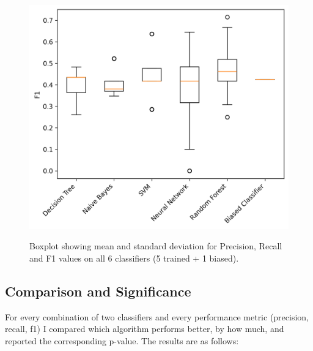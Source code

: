 \documentclass{article}
\newcommand\templateInstruction[1]{
\hl{#1}
}
\begin{document}
\begin{figure}
\begin{minipage}{0.45\linewidth}
	    \label{fig:recall}
        \end{minipage} \\	
	\begin{minipage}{0.45\linewidth}
	    \includegraphics[width=\linewidth]{f1.png}
	\label{fig:f1}
         \end{minipage}
\caption{Boxplot showing mean and standard deviation for Precision, Recall and F1 values on all 6 classifiers (5 trained + 1 biased).}
\label{fig:boxplot}
\end{figure}


\subsection{Comparison and Significance}

For every combination of two classifiers and every performance metric (precision, recall, f1) I compared which algorithm performs better, by how much, and reported the corresponding p-value. The results are as follows:
\end{document}

